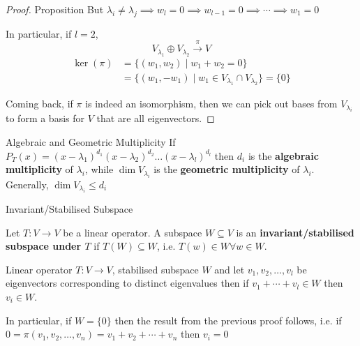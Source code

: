 \begin{proof} {Proposition}
    But \(\lambda_i \neq \lambda_j \implies w_l = 0 \implies w_{l-1} = 0 \implies \cdots \implies w_1 = 0\)

    In particular, if \(l = 2\), \[
        V_{\lambda_1} \oplus V_{\lambda_2} \xrightarrow{\pi} V
    \]
    \begin{align*}
        \ker(\pi) & = \{(w_1, w_2) \mid w_1 + w_2 = 0\}                                      \\
                  & = \{(w_1, -w_1) \mid  w_1 \in V_{\lambda_1} \cap V_{\lambda_2}\} = \{0\}
    \end{align*}

    Coming back, if \(\pi\) is indeed an isomorphism, then we can pick out bases from \(V_{\lambda_i}\) to form a basis for \(V\) that are all eigenvectors.
\end{proof}

\begin{definition} {Algebraic and Geometric Multiplicity}
    If \(P_T(x) = (x-\lambda_1)^{d_1}(x-\lambda_2)^{d_2}\dots (x-\lambda_l)^{d_l}\) then \(d_i\) is the \textbf{algebraic multiplicity} of \(\lambda_i\), while \(\dim V_{\lambda_i}\)   is the \textbf{geometric multiplicity} of \(\lambda_i\). Generally, \(\dim V_{\lambda_i} \leq d_i\)
\end{definition}

\begin{definition} {Invariant/Stabilised Subspace}

    Let \(T: V \to V\) be a linear operator. A subspace \(W \subseteq V\) is an \textbf{invariant/stabilised subspace under \(T\)} if \(T(W) \subseteq W \), i.e. \(T(w) \in W \forall w \in W\).
\end{definition}
\begin{lemma}
    Linear operator \(T: V \to V\), stabilised subspace \(W\) and let \(v_1, v_2, \dots, v_l\) be eigenvectors corresponding to distinct eigenvalues then if \(v_1 + \cdots + v_l \in W\) then \(v_i \in W\).
\end{lemma}

\begin{remark}
    In particular, if \(W = \{0\}\) then the result from the previous proof follows, i.e. if \(0 = \pi(v_1, v_2, \dots, v_n) = v_1 + v_2 + \cdots + v_n\) then \(v_i = 0\)
\end{remark}

